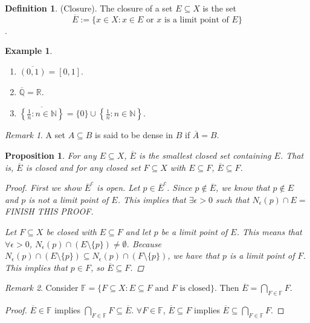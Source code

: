 \documentclass[10pt]{article}
\newcommand{\N}{\mathbb{N}}
\newcommand{\R}{\mathbb{R}}
\newcommand{\F}{\mathbb{F}}
\newcommand{\Q}{\mathbb{Q}}
\newtheorem{proposition}[theorem]{Proposition}
\theoremstyle{definition}
\newtheorem{definition}[theorem]{Definition}
\newtheorem{example}[theorem]{Example}
\theoremstyle{remark}
\newtheorem*{remark}{Remark}
\begin{document}
\begin{definition}
    (Closure).
    The closure of a set $E \subseteq X$ is the set $$\overline{E} := \{x \in X \colon x \in E \text{ or } x \text{ is a limit point of } E\}$$.
\end{definition}
\begin{example} \hfill
    \begin{enumerate}
        \item $\overline{(0, 1)} = [0, 1]$.
        \item $\overline{\Q} = \R$.
        \item $\overline{\left\{\frac{1}{n} \colon n \in \N\right\}} = \{0\} \cup \left\{\frac{1}{n} \colon n \in \N\right\}$.
    \end{enumerate}
\end{example}

\begin{remark}
    A set $A \subseteq B$ is said to be dense in $B$ if $\overline{A} = B$.
\end{remark}

\begin{proposition}
    For any $E \subseteq X$, $\overline{E}$ is the smallest closed set containing $E$. That is, $\overline{E}$ is closed and for any closed set $F \subseteq X$ with $E \subseteq F$, $\overline{E} \subseteq F$.
    \begin{proof}
        First we show $\overline{E}^c$ is open. Let $p \in \overline{E}^c$. Since $p \not\in \overline{E}$, we know that $p \not\in E$ and $p$ is not a limit point of $E$.
        This implies that $\exists \epsilon > 0$ such that $N_\epsilon(p) \cap E = $ FINISH THIS PROOF.

        Let $F \subseteq X$ be closed with $E \subseteq F$ and let $p$ be a limit point of $E$. This means that $\forall \epsilon > 0$, $N_\epsilon(p) \cap (E \setminus \{p\}) \neq \emptyset$.
        Because $N_\epsilon(p) \cap (E \setminus \{p\}) \subseteq N_\epsilon(p) \cap (F \setminus \{p\})$, we have that $p$ is a limit point of $F$.
        This implies that $p \in  F$, so $\overline{E} \subseteq F$.
    \end{proof}
\end{proposition}

\begin{remark}
    Consider $\F = \{F \subseteq X \colon E \subseteq F \text{ and $F$ is closed}\}$. Then $\overline{E} = \bigcap_{F \in \F} F$.
    \begin{proof}
        $\overline{E} \in \F$ implies $\bigcap_{F \in \F} F \subseteq \overline{E}$. $\forall F \in \F$, $\overline{E} \subseteq F$ implies $\overline{E} \subseteq \bigcap_{F \in \F} F$.
    \end{proof}
\end{remark}
\end{document}
